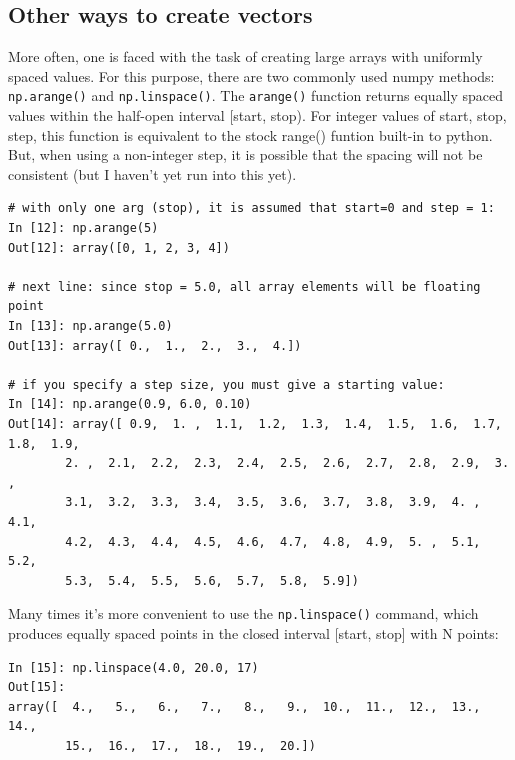 \subsection{Other ways to create vectors}\label{subsec:arangelinspace}
More often, one is faced with the task of creating large arrays with uniformly 
spaced values. For this purpose, there are two commonly used numpy methods:
\lstinline{np.arange()} and \lstinline{np.linspace()}.
The \lstinline{arange()} function returns equally spaced values within the half-open 
interval [start, stop). For integer values of start, stop, step, this function is equivalent to the 
stock range() funtion built-in to python. But, when using a non-integer step, it is possible that the 
spacing will not be consistent (but I haven't yet run into this yet).
\begin{lstlisting}
# with only one arg (stop), it is assumed that start=0 and step = 1:
In [12]: np.arange(5) 
Out[12]: array([0, 1, 2, 3, 4])

# next line: since stop = 5.0, all array elements will be floating point
In [13]: np.arange(5.0) 
Out[13]: array([ 0.,  1.,  2.,  3.,  4.])

# if you specify a step size, you must give a starting value:
In [14]: np.arange(0.9, 6.0, 0.10) 
Out[14]: array([ 0.9,  1. ,  1.1,  1.2,  1.3,  1.4,  1.5,  1.6,  1.7,  1.8,  1.9,
        2. ,  2.1,  2.2,  2.3,  2.4,  2.5,  2.6,  2.7,  2.8,  2.9,  3. ,
        3.1,  3.2,  3.3,  3.4,  3.5,  3.6,  3.7,  3.8,  3.9,  4. ,  4.1,
        4.2,  4.3,  4.4,  4.5,  4.6,  4.7,  4.8,  4.9,  5. ,  5.1,  5.2,
        5.3,  5.4,  5.5,  5.6,  5.7,  5.8,  5.9])	
\end{lstlisting}	
Many times it's more convenient to use the \lstinline{np.linspace()} command, which produces 
equally spaced points in the closed interval [start, stop] with N points:
\begin{lstlisting}
In [15]: np.linspace(4.0, 20.0, 17)
Out[15]:
array([  4.,   5.,   6.,   7.,   8.,   9.,  10.,  11.,  12.,  13.,  14.,
        15.,  16.,  17.,  18.,  19.,  20.])	
\end{lstlisting}

